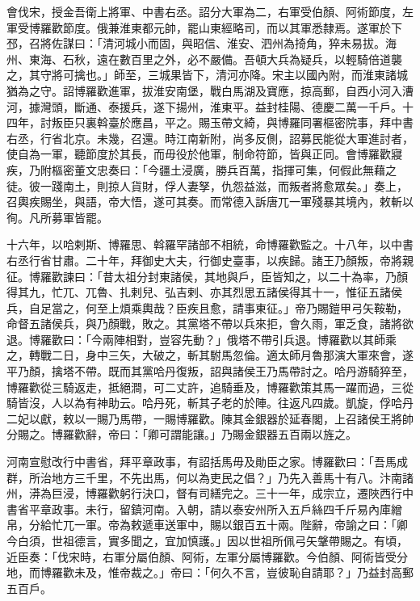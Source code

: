 \begin{pinyinscope}
 會伐宋，授金吾衛上將軍、中書右丞。詔分大軍為二，右軍受伯顏、阿術節度，左軍受博羅歡節度。俄兼淮東都元帥，罷山東經略司，而以其軍悉隸焉。遂軍於下邳，召將佐謀曰：「清河城小而固，與昭信、淮安、泗州為掎角，猝未易拔。海州、東海、石秋，遠在數百里之外，必不嚴備。吾頓大兵為疑兵，以輕騎倍道襲之，其守將可擒也。」師至，三城果皆下，清河亦降。宋主以國內附，而淮東諸城猶為之守。詔博羅歡進軍，拔淮安南堡，戰白馬湖及寶應，掠高郵，自西小河入漕河，據灣頭，斷通、泰援兵，遂下揚州，淮東平。益封桂陽、德慶二萬一千戶。十四年，討叛臣只裏斡臺於應昌，平之。賜玉帶文綺，與博羅同署樞密院事，拜中書右丞，行省北京。未幾，召還。時江南新附，尚多反側，詔募民能從大軍進討者，使自為一軍，聽節度於其長，而毋役於他軍，制命符節，皆與正同。會博羅歡寢疾，乃附樞密董文忠奏曰：「今疆土浸廣，勝兵百萬，指揮可集，何假此無藉之徒。彼一踐南土，則掠人貨財，俘人妻孥，仇怨益滋，而叛者將愈眾矣。」奏上，召輿疾賜坐，與語，帝大悟，遂可其奏。而常德入訴唐兀一軍殘暴其境內，敕斬以徇。凡所募軍皆罷。



 十六年，以哈剌斯、博羅思、斡羅罕諸部不相統，命博羅歡監之。十八年，以中書右丞行省甘肅。二十年，拜御史大夫，行御史臺事，以疾歸。諸王乃顏叛，帝將親征。博羅歡諫曰：「昔太祖分封東諸侯，其地與戶，臣皆知之，以二十為率，乃顏得其九，忙兀、兀魯、扎剌兒、弘吉剌、亦其烈思五諸侯得其十一，惟征五諸侯兵，自足當之，何至上煩乘輿哉？臣疾且愈，請事東征。」帝乃賜鎧甲弓矢鞍勒，命督五諸侯兵，與乃顏戰，敗之。其黨塔不帶以兵來拒，會久雨，軍乏食，諸將欲退。博羅歡曰：「今兩陣相對，豈容先動？」俄塔不帶引兵退。博羅歡以其師乘之，轉戰二日，身中三矢，大破之，斬其駙馬忽倫。適太師月魯那演大軍來會，遂平乃顏，擒塔不帶。既而其黨哈丹復叛，詔與諸侯王乃馬帶討之。哈丹游騎猝至，博羅歡從三騎返走，抵絕澗，可二丈許，追騎垂及，博羅歡策其馬一躍而過，三從騎皆沒，人以為有神助云。哈丹死，斬其子老的於陣。往返凡四歲。凱旋，俘哈丹二妃以獻，敕以一賜乃馬帶，一賜博羅歡。陳其金銀器於延春閣，上召諸侯王將帥分賜之。博羅歡辭，帝曰：「卿可謂能讓。」乃賜金銀器五百兩以旌之。



 河南宣慰改行中書省，拜平章政事，有詔括馬毋及勛臣之家。博羅歡曰：「吾馬成群，所治地方三千里，不先出馬，何以為吏民之倡？」乃先入善馬十有八。汴南諸州，漭為巨浸，博羅歡躬行決口，督有司繕完之。三十一年，成宗立，遷陜西行中書省平章政事。未行，留鎮河南。入朝，請以泰安州所入五戶絲四千斤易內庫繒帛，分給忙兀一軍。帝為敕遞車送軍中，賜以銀百五十兩。陛辭，帝諭之曰：「卿今白須，世祖德言，實多聞之，宜加慎護。」因以世祖所佩弓矢鞶帶賜之。有頃，近臣奏：「伐宋時，右軍分屬伯顏、阿術，左軍分屬博羅歡。今伯顏、阿術皆受分地，而博羅歡未及，惟帝裁之。」帝曰：「何久不言，豈彼恥自請耶？」乃益封高郵五百戶。




\end{pinyinscope}
